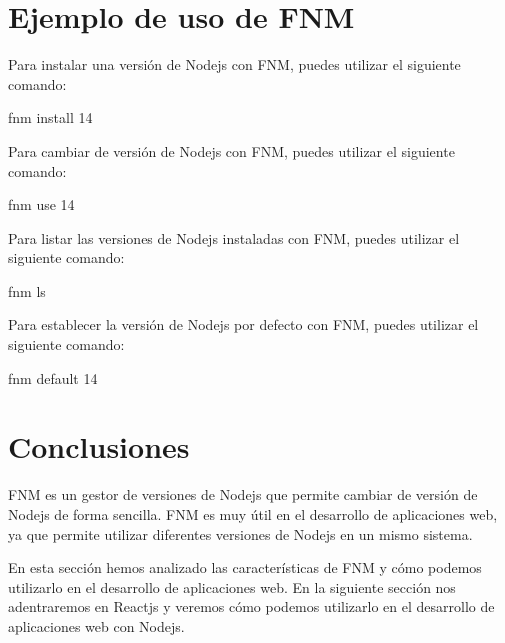 \documentclass[
  a4paper,
  DIV=11,
  numbers=noendperiod,
  onepage,
  openany]{scrreprt}
\newenvironment{Shaded}{\begin{snugshade}}{\end{snugshade}}
\newcommand{\ExtensionTok}[1]{\textcolor[rgb]{0.00,0.23,0.31}{#1}}
\newcommand{\NormalTok}[1]{\textcolor[rgb]{0.00,0.23,0.31}{#1}}
\begin{document}
\begin{tcolorbox}
\section{Ejemplo de uso de FNM}\label{ejemplo-de-uso-de-fnm}

Para instalar una versión de Nodejs con FNM, puedes utilizar el
siguiente comando:

\begin{Shaded}
\begin{Highlighting}[]
\ExtensionTok{fnm}\NormalTok{ install 14}
\end{Highlighting}
\end{Shaded}

Para cambiar de versión de Nodejs con FNM, puedes utilizar el siguiente
comando:

\begin{Shaded}
\begin{Highlighting}[]
\ExtensionTok{fnm}\NormalTok{ use 14}
\end{Highlighting}
\end{Shaded}

Para listar las versiones de Nodejs instaladas con FNM, puedes utilizar
el siguiente comando:

\begin{Shaded}
\begin{Highlighting}[]
\ExtensionTok{fnm}\NormalTok{ ls}
\end{Highlighting}
\end{Shaded}

Para establecer la versión de Nodejs por defecto con FNM, puedes
utilizar el siguiente comando:

\begin{Shaded}
\begin{Highlighting}[]
\ExtensionTok{fnm}\NormalTok{ default 14}
\end{Highlighting}
\end{Shaded}

\section{Conclusiones}\label{conclusiones-5}

FNM es un gestor de versiones de Nodejs que permite cambiar de versión
de Nodejs de forma sencilla. FNM es muy útil en el desarrollo de
aplicaciones web, ya que permite utilizar diferentes versiones de Nodejs
en un mismo sistema.

En esta sección hemos analizado las características de FNM y cómo
podemos utilizarlo en el desarrollo de aplicaciones web. En la siguiente
sección nos adentraremos en Reactjs y veremos cómo podemos utilizarlo en
el desarrollo de aplicaciones web con Nodejs.


\end{tcolorbox}
\end{document}
